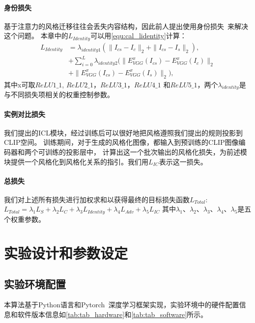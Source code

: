 \paragraph{身份损失}
基于注意力的风格迁移往往会丢失内容结构，因此前人提出使用身份损失~\cite{zhao2020unpaired}来解决这个问题。
本章中的$L_{Identity}$可以用\autoref{equ:cal_lidentity}计算：
\begin{equation}
    \label{equ:cal_lidentity}
    \begin{aligned}
        L_{Identity}& =\lambda_{identity1}(\parallel I_{cs}-I_c\parallel_2+\parallel I_{cs}-I_s\parallel_2), \\
        &+\sum_{i=0}^L\lambda_{identity2}(\parallel E_{VGG}^x(I_{cs})-E_{VGG}^x(I_c)\parallel_2 \\
        &+\parallel E_{VGG}^x(I_{cs})-E_{VGG}^x(I_s)\parallel_2),
        \end{aligned}
\end{equation}
其中x可取$ReLU1\_1$, $ReLU2\_1$，$ReLU3\_1$，$ReLU4\_1$
和$ReLU5\_1$，两个$\lambda_{identity}$是与不同损失项相关的权重控制参数。



\paragraph{实例对比损失}
我们提出的ICL模块，经过训练后可以很好地把风格遵照我们提出的规则投影到CLIP空间。
训练期间，对于生成的风格化图像，都输入到预训练的CLIP图像编码器和两个可训练的投影层中，
计算出这一个批次输出的风格化损失，为前述模块提供一个风格化到风格化关系的指引。我们用$L_{IC}$表示这一损失。
\paragraph{总损失}
我们对上述所有损失进行加权求和以获得最终的目标损失函数$L_{Total}$:\(L_{Total}= \lambda_{1}L_{S}+\lambda_{2}L_{C}+\lambda_{3}L_{Identity}+\lambda_{4}L_{Adv}+\lambda_{5}L_{IC}\)
其中$\lambda_1$、$\lambda_2$、$\lambda_3$、$\lambda_4$、$\lambda_5$是五个权重参数。

\section{实验设计和参数设定}
\subsection{实验环境配置}
本算法基于Python语言和Pytorch~\cite{paszke2019pytorch}深度学习框架实现，实验环境中的硬件配置信息和软件版本信息如\autoref{tab:tab_hardware}和\autoref{tab:tab_software}所示。


